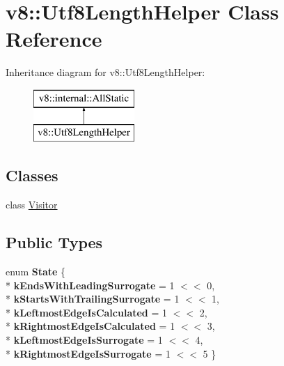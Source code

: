 \hypertarget{classv8_1_1_utf8_length_helper}{}\section{v8\+:\+:Utf8\+Length\+Helper Class Reference}
\label{classv8_1_1_utf8_length_helper}
Inheritance diagram for v8\+:\+:Utf8\+Length\+Helper\+:\begin{figure}[H]
\begin{center}
\leavevmode
\includegraphics[height=2.000000cm]{classv8_1_1_utf8_length_helper}
\end{center}
\end{figure}
\subsection*{Classes}
\begin{DoxyCompactItemize}
\item 
class \hyperlink{classv8_1_1_utf8_length_helper_1_1_visitor}{Visitor}
\end{DoxyCompactItemize}
\subsection*{Public Types}
\begin{DoxyCompactItemize}
\item 
enum {\bfseries State} \{ \\*
{\bfseries k\+Ends\+With\+Leading\+Surrogate} = 1 $<$$<$ 0, 
\\*
{\bfseries k\+Starts\+With\+Trailing\+Surrogate} = 1 $<$$<$ 1, 
\\*
{\bfseries k\+Leftmost\+Edge\+Is\+Calculated} = 1 $<$$<$ 2, 
\\*
{\bfseries k\+Rightmost\+Edge\+Is\+Calculated} = 1 $<$$<$ 3, 
\\*
{\bfseries k\+Leftmost\+Edge\+Is\+Surrogate} = 1 $<$$<$ 4, 
\\*
{\bfseries k\+Rightmost\+Edge\+Is\+Surrogate} = 1 $<$$<$ 5
 \}\hypertarget{classv8_1_1_utf8_length_helper_a964fff2270978f2926b768f2aa5d0623}{}\label{classv8_1_1_utf8_length_helper_a964fff2270978f2926b768f2aa5d0623}

\end{DoxyCompactItemize}

